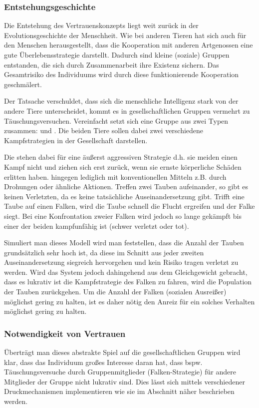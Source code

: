 \subsubsection{Entstehungsgeschichte}
Die Entstehung des Vertrauenskonzepts liegt weit zurück in der Evolutionsgeschichte der Menschheit.
Wie bei anderen Tieren hat sich auch für den Menschen herausgestellt, dass die Kooperation mit anderen Artgenossen eine gute Überlebensstrategie darstellt.
Dadurch sind kleine (soziale) Gruppen entstanden, die sich durch Zusammenarbeit ihre Existenz sichern.
Das Gesamtrisiko des Individuums wird durch diese funktionierende Kooperation geschmälert.
\cite{liars-and-outliers}

Der Tatsache verschuldet, dass sich die menschliche Intelligenz stark von der andere Tiere unterscheidet, kommt es in gesellschaftlichen Gruppen vermehrt zu Täuschungsversuchen. Vereinfacht setzt sich eine Gruppe aus zwei Typen zusammen:  und .
Die beiden Tiere sollen dabei zwei verschiedene Kampfstrategien in der Gesellschaft darstellen.

Die  stehen dabei für eine äußerst aggressiven Strategie d.h. sie meiden einen Kampf nicht und ziehen sich erst zurück, wenn sie ernste körperliche Schäden erlitten haben.
 hingegen  lediglich mit konventionellen Mitteln z.B. durch Drohungen oder ähnliche Aktionen.
Treffen zwei Tauben aufeinander, so gibt es keinen Verletzten, da es keine tatsächliche Auseinandersetzung gibt.
Trifft eine Taube auf einen Falken, wird die Taube schnell die Flucht ergreifen und der Falke siegt.
Bei eine Konfrontation zweier Falken wird jedoch so lange gekämpft bis einer der beiden kampfunfähig ist (schwer verletzt oder tot).

Simuliert man dieses Modell wird man feststellen, dass die Anzahl der Tauben grundsätzlich sehr hoch ist, da diese im Schnitt aus jeder zweiten Auseinandersetzung siegreich hervorgehen und kein Risiko tragen verletzt zu werden.
Wird das System jedoch dahingehend aus dem Gleichgewicht gebracht, dass es lukrativ ist die Kampfstrategie des Falken zu fahren, wird die Population der Tauben zurückgehen.
Um die Anzahl der Falken (sozialen Ausreißer) möglichst gering zu halten, ist es daher nötig den Anreiz für ein solches Verhalten möglichst gering zu halten.
\cite{tauben-falken}

\subsubsection{Notwendigkeit von Vertrauen}\label{sec:notwendigkeit-von-vertauen}
Überträgt man dieses abstrakte Spiel auf die gesellschaftlichen Gruppen wird klar, dass das Individuum großes Interesse daran hat, dass bspw. Täuschungsversuche durch Gruppenmitglieder (Falken-Strategie) für andere Mitglieder der Gruppe nicht lukrativ sind.
Dies lässt sich mittels verschiedener Druckmechanismen implementieren wie sie im Abschnitt  näher beschrieben werden.

